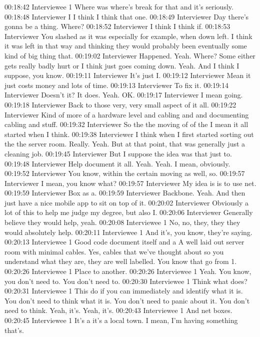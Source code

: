 00:18:42 Interviewee 1
Where was where's break for that and it's seriously.
00:18:48 Interviewer
I I think I think that one.
00:18:49 Interviewer
Day there's gonna be a thing. Where?
00:18:52 Interviewer
I think I think if.
00:18:53 Interviewer
You slashed as it was especially for example, when down left. I think it was left in that way and thinking they would probably been eventually some kind of big thing that.
00:19:02 Interviewer
Happened. Yeah. Where? Some either gets really badly hurt or I think just goes coming down. Yeah. And I think I suppose, you know.
00:19:11 Interviewer
It's just I.
00:19:12 Interviewer
Mean it just costs money and lots of time.
00:19:13 Interviewer
To fix it.
00:19:14 Interviewer
Doesn't it? It does. Yeah. OK.
00:19:17 Interviewer
I mean going.
00:19:18 Interviewer
Back to those very, very small aspect of it all.
00:19:22 Interviewer
Kind of more of a hardware level and cabling and and documenting cabling and stuff.
00:19:32 Interviewer
So the the moving of of the I mean it all started when I think.
00:19:38 Interviewer
I think when I first started sorting out the the server room. Really. Yeah. But at that point, that was generally just a cleaning job.
00:19:45 Interviewer
But I suppose the idea was that just to.
00:19:48 Interviewer
Help document it all. Yeah. Yeah. I mean, obviously.
00:19:52 Interviewer
You know, within the certain moving as well, so.
00:19:57 Interviewer
I mean, you know what?
00:19:57 Interviewer
My idea is is to use net.
00:19:59 Interviewer
Box as a.
00:19:59 Interviewer
Backbone. Yeah. And then just have a nice mobile app to sit on top of it.
00:20:02 Interviewer
Obviously a lot of this to help me judge my degree, but also I.
00:20:06 Interviewer
Generally believe they would help, yeah.
00:20:08 Interviewee 1
No, no, they, they they would absolutely help.
00:20:11 Interviewee 1
And it's, you know, they're saying.
00:20:13 Interviewee 1
Good code document itself and a A well laid out server room with minimal cables. Yes, cables that we've thought about so you understand what they are, they are well labelled. You know that go from 1.
00:20:26 Interviewee 1
Place to another.
00:20:26 Interviewee 1
Yeah. You know, you don't need to. You don't need to.
00:20:30 Interviewee 1
Think what does?
00:20:31 Interviewee 1
This do if you can immediately and identify what it is. You don't need to think what it is. You don't need to panic about it. You don't need to think. Yeah, it's. Yeah, it's.
00:20:43 Interviewee 1
And net boxes.
00:20:45 Interviewee 1
It's a it's a local town. I mean, I'm having something that's.
